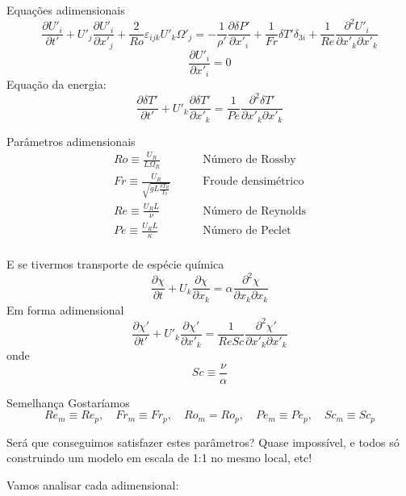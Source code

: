 \documentclass{beamer}
\begin{document}
\begin{frame}{Equações adimensionais}
  \[
  \frac{\partial U'_i}{\partial t'} + U'_j\frac{\partial U'_i}{\partial x'_j} + \frac{2}{Ro}\varepsilon_{ijk} U'_k\Omega'_j = -\frac{1}{\rho'}\frac{\partial \delta P'}{\partial x'_i} + \frac{1}{Fr}\delta T' \delta_{3i} + \frac{1}{Re} \frac{\partial^2 U'_i}{\partial x'_k \partial x'_k}
  \]
  \[
  \frac{\partial U'_i}{\partial x'_i} = 0
  \]
  Equação da energia:
  \[
  \frac{\partial\delta T'}{\partial t'} + U'_k \frac{\partial\delta T'}{\partial x'_k} = \frac{1}{Pe} \frac{\partial^2\delta T'}{\partial x'_k \partial x'_k}
  \]
\end{frame}

\begin{frame}{Parâmetros adimensionais}
  \[
  \begin{aligned}
    Ro \equiv \frac{U_R}{L\Omega_R} \qquad &\text{Número de Rossby}\\
    Fr \equiv \frac{U_R}{\sqrt{g L \frac{\delta T_R}{T_0}}} \qquad &\text{Froude densimétrico}\\
      Re \equiv \frac{U_R L}{\nu} \qquad &\text{Número de Reynolds}\\
      Pe \equiv \frac{U_R L}{\kappa} \qquad &\text{Número de Peclet}\\
  \end{aligned}
  \]
\end{frame}

\begin{frame}{E se tivermos transporte de espécie química}
  \[
  \frac{\partial \chi}{\partial t} + U_k\frac{\partial\chi}{\partial x_k} = \alpha \frac{\partial^2\chi}{\partial x_k \partial x_k}
  \]
  Em forma adimensional
  \[
  \frac{\partial \chi'}{\partial t'} + U'_k\frac{\partial\chi'}{\partial x'_k} = \frac{1}{ReSc} \frac{\partial^2\chi'}{\partial x'_k \partial x'_k}
  \]
  onde
  \[
  Sc \equiv \frac{\nu}{\alpha}
  \]
  
\end{frame}

\begin{frame}{Semelhança}
Gostaríamos
  \[
  Re_m\equiv Re_p, \quad Fr_m\equiv Fr_p, \quad Ro_m = Ro_p, \quad Pe_m\equiv Pe_p, \quad Sc_m\equiv Sc_p
  \]

  Será que conseguimos satisfazer estes parâmetros? Quase impossível, e todos só construindo um modelo em escala de 1:1 no mesmo local, etc!

  Vamos analisar cada adimensional:
\end{frame}
\end{document}
